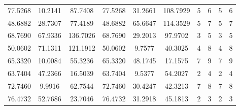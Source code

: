 \documentclass[withoutpreface,bwprint]{cumcmthesis}
\begin{document}
\begin{appendices}
\begin{table}[htbp!]
\begin{tabular}{@{}cccccccccc@{}}
				77.5268                          & 10.2141                          & 87.7408                          & 77.5268                          & 31.2661                          & 108.7929                         & 5                    & 6                    & 5                      & 6                      \\ \cmidrule(lr){7-7}
				48.6882                          & 28.7307                          & 77.4189                          & 48.6882                          & 65.6647                          & 114.3529                         & 5                    & 7                    & 5                      & 7                      \\
				68.7690                          & 67.9336                          & 136.7026                         & 68.7690                          & 29.2013                          & 97.9702                          & 3                    & 5                    & 3                      & 5                      \\
				50.0602                          & 71.1311                          & 121.1912                         & 50.0602                          & 9.7577                           & 40.3025                          & 4                    & 8                    & 4                      & 8                      \\
				65.3320                          & 10.0084                          & 55.3236                          & 65.3320                          & 48.1745                          & 17.1575                          & 7                    & 9                    & 7                      & 9                      \\
				63.7404                          & 47.2366                          & 16.5039                          & 63.7404                          & 9.5377                           & 54.2027                          & 2                    & 4                    & 2                      & 4                      \\
				72.7460                          & 9.9916                           & 62.7544                          & 72.7460                          & 30.4247                          & 42.3213                          & 7                    & 8                    & 7                      & 8                      \\
				76.4732                          & 52.7686                          & 23.7046                          & 76.4732                          & 31.2918                          & 45.1813                          & 2                    & 3                    & 2                      & 3                      \\

\end{tabular}
\end{table}
\end{appendices}
\end{document}
